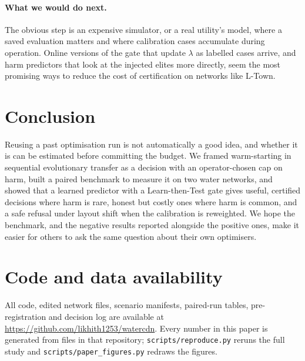 \documentclass[11pt]{article}
\begin{document}
\paragraph{What we would do next.} The obvious step is an expensive simulator, or a real utility's model, where a
saved evaluation matters and where calibration cases accumulate during operation. Online versions of the gate that
update $\lambda$ as labelled cases arrive, and harm predictors that look at the injected elites more directly, seem
the most promising ways to reduce the cost of certification on networks like L-Town.

\section{Conclusion}\label{sec:conclusion}

Reusing a past optimisation run is not automatically a good idea, and whether it is can be estimated before
committing the budget. We framed warm-starting in sequential evolutionary transfer as a decision with an operator-chosen
cap on harm, built a paired benchmark to measure it on two water networks, and showed that a learned predictor
with a Learn-then-Test gate gives useful, certified decisions where harm is rare, honest but costly ones where harm is
common, and a safe refusal under layout shift when the calibration is reweighted. We hope the benchmark, and the
negative results reported alongside the positive ones, make it easier for others to ask the same question about
their own optimisers.

\section*{Code and data availability}
All code, edited network files, scenario manifests, paired-run tables, pre-registration and decision log are
available at \url{https://github.com/likhith1253/watercdn}. Every number in this paper is generated from files in
that repository; \texttt{scripts/reproduce.py} reruns the full study and \texttt{scripts/paper\_figures.py} redraws
the figures.

\end{document}
